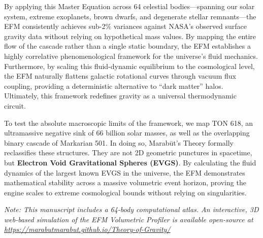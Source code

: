 \documentclass[11pt, a4paper]{article}
\begin{document}
  By applying this Master Equation across 64 celestial bodies---spanning our solar system, extreme exoplanets, brown dwarfs, and degenerate stellar remnants---the EFM consistently achieves sub-2\% variances against NASA's observed surface gravity data \cite{nasa2024} without relying on hypothetical mass values. By mapping the entire flow of the cascade rather than a single static boundary, the EFM establishes a highly correlative phenomenological framework for the universe's fluid mechanics. Furthermore, by scaling this fluid-dynamic equilibrium to the cosmological level, the EFM naturally flattens galactic rotational curves through vacuum flux coupling, providing a deterministic alternative to ``dark matter'' halos. Ultimately, this framework redefines gravity as a universal thermodynamic circuit.

  To test the absolute macroscopic limits of the framework, we map TON 618, an ultramassive negative sink of 66 billion solar masses, as well as the overlapping binary cascade of Markarian 501. In doing so, Marab\={u}t's Theory formally reclassifies these structures. They are not 2D geometric punctures in spacetime, but \textbf{Electron Void Gravitational Spheres (EVGS)}. By calculating the fluid dynamics of the largest known EVGS in the universe, the EFM demonstrates mathematical stability across a massive volumetric event horizon, proving the engine scales to extreme cosmological bounds without relying on singularities.
  
  \textit{Note: This manuscript includes a 64-body computational atlas. An interactive, 3D web-based simulation of the EFM Volumetric Profiler is available open-source at \url{https://marabutmarabut.github.io/Theory-of-Gravity/}}
\endgroup

\clearpage
\makeatletter
\renewcommand*\l@subsection{\@dottedtocline{2}{1.5em}{3.2em}} %
\makeatother
\tableofcontents
\clearpage

\end{document}
